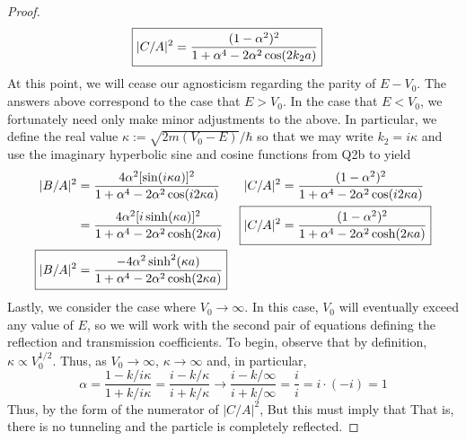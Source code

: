 \documentclass[../psets.tex]{subfiles}
\begin{document}
\begin{enumerate}
\begin{proof}
\begin{align*}
            \Aboxed{|C/A|^2 &= \frac{(1-\alpha^2)^2}{1+\alpha^4-2\alpha^2\cos(2k_2a)}}
        \end{align*}
        At this point, we will cease our agnosticism regarding the parity of $E-V_0$. The answers above correspond to the case that $E>V_0$. In the case that $E<V_0$, we fortunately need only make minor adjustments to the above. In particular, we define the real value $\kappa:=\sqrt{2m(V_0-E)}/\hbar$ so that we may write $k_2=i\kappa$ and use the imaginary hyperbolic sine and cosine functions from Q2b to yield
        \begin{align*}
            |B/A|^2 &= \frac{4\alpha^2[\sin(i\kappa a)]^2}{1+\alpha^4-2\alpha^2\cos(i2\kappa a)}&
                |C/A|^2 &= \frac{(1-\alpha^2)^2}{1+\alpha^4-2\alpha^2\cos(i2\kappa a)}\\
            &= \frac{4\alpha^2[i\sinh(\kappa a)]^2}{1+\alpha^4-2\alpha^2\cosh(2\kappa a)}&
                \Aboxed{|C/A|^2 &= \frac{(1-\alpha^2)^2}{1+\alpha^4-2\alpha^2\cosh(2\kappa a)}}\\
            \Aboxed{|B/A|^2 &= \frac{-4\alpha^2\sinh^2(\kappa a)}{1+\alpha^4-2\alpha^2\cosh(2\kappa a)}}
        \end{align*}
        Lastly, we consider the case where $V_0\to\infty$. In this case, $V_0$ will eventually exceed any value of $E$, so we will work with the second pair of equations defining the reflection and transmission coefficients. To begin, observe that by definition, $\kappa\propto V_0^{1/2}$. Thus, as $V_0\to\infty$, $\kappa\to\infty$ and, in particular,
        \begin{equation*}
            \alpha = \frac{1-k/i\kappa}{1+k/i\kappa}
            = \frac{i-k/\kappa}{i+k/\kappa}
            \to \frac{i-k/\infty}{i+k/\infty}
            = \frac{i}{i}
            = i\cdot(-i)
            = 1
        \end{equation*}
        Thus, by the form of the numerator of $|C/A|^2$,  But this must imply that  That is, there is no tunneling and the particle is completely reflected.
    \end{proof}
\end{enumerate}
\end{document}
